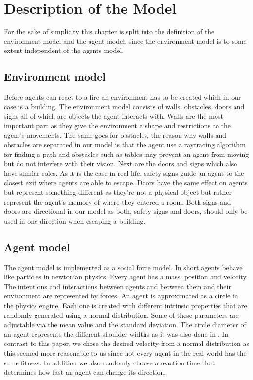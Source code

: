 \documentclass[11pt]{article}
\begin{document}
\section{Description of the Model}

For the sake of simplicity this chapter is split into the definition of the environment model and the agent model, since the environment model is to some extent independent of the agents model. 

\subsection{Environment model}

Before agents can react to a fire an environment has to be created which in our case is a building. The environment model consists of walls, obstacles, doors and signs all of which are objects the agent interacts with. Walls are the most important part as they give the environment a shape and restrictions to the agent's movements. The same goes for obstacles, the reason why walls and obstacles are separated in our model is that the agent use a raytracing algorithm for finding a path and obstacles such as tables may prevent an agent from moving but do not interfere with their vision. Next are the doors and signs which also have similar roles. As it is the case in real life, safety signs guide an agent to the closest exit where agents are able to escape. Doors have the same effect on agents but represent something different as they're not a physical object but rather represent the agent's memory of where they entered a room. Both signs and doors are directional in our model as both, safety signs and doors, should only be used in one direction when escaping a building.

\subsection{Agent model}
The agent model is implemented as a social force model. In short agents behave like particles in newtonian physics. Every agent has a mass, position and velocity. The intentions and interactions between agents and between them and their environment are represented by forces. An agent is approximated as a circle in the physics engine. Each one is created with different intrinsic properties that are randomly generated using a normal distribution. Some of these parameters are adjustable via the mean value and the standard deviation. The circle diameter of an agent represents the different shoulder widths as it was also done in \cite{Helbing}. In contrast to this paper, we chose the desired velocity from a normal distribution as this seemed more reasonable to us since not every agent in the real world has the same fitness. In addition we also randomly choose a reaction time that determines how fast an agent can change its direction.
\end{document}

